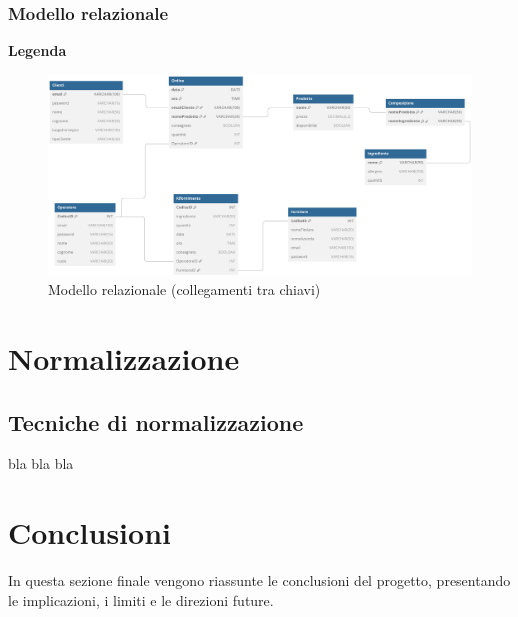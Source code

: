 \documentclass[12pt,a4paper]{article}
\begin{document}
    \newpage
    \subsubsection{Modello relazionale}
    \textbf{Legenda}
    \begin{figure}[H]
        \centering
        \vspace{-10pt}  %
        \includegraphics[width=\textwidth]{figures/Relational_model.pdf}
        \vspace{-20pt}  %
        \caption{Modello relazionale (collegamenti tra chiavi)}
    \end{figure} 
    


    \newpage
    \section{Normalizzazione}
    
    \subsection{Tecniche di normalizzazione}
    bla bla bla

    \section{Conclusioni}
    In questa sezione finale vengono riassunte le conclusioni del progetto, presentando le implicazioni, i limiti e le direzioni future.
\end{document}
